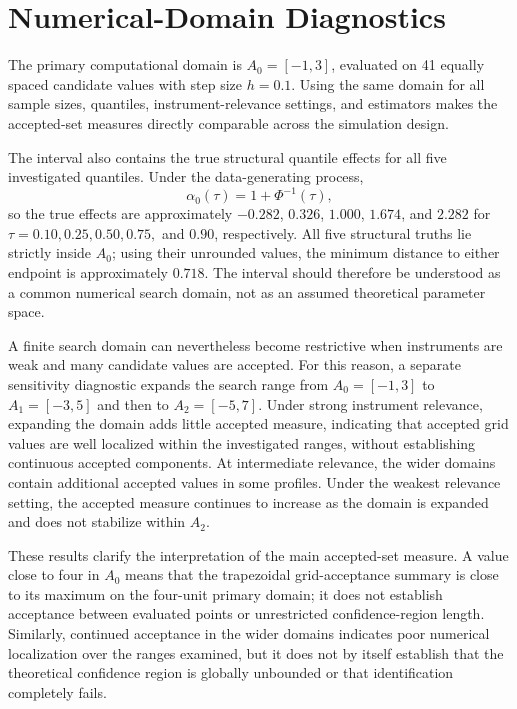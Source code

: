 \section{Numerical-Domain Diagnostics}
\setcounter{equation}{0}\setcounter{table}{0}\setcounter{figure}{0}
\label{app:numerical-domain-diagnostics}

\label{app:domain-choice}

The primary computational domain is \(A_0=[-1,3]\), evaluated on 41 equally spaced candidate values with step size \(h=0.1\). 
Using the same domain for all sample sizes, quantiles, instrument-relevance settings, and estimators makes the accepted-set measures directly comparable across the simulation design.

The interval also contains the true structural quantile effects for all five investigated quantiles. Under the data-generating process,
\[
\alpha_0(\tau)=1+\Phi^{-1}(\tau),
\]
so the true effects are approximately \(-0.282\), \(0.326\), \(1.000\), \(1.674\), and \(2.282\) for \(\tau=0.10,0.25,0.50,0.75,\) and \(0.90\), respectively. All five structural truths lie strictly inside \(A_0\); using their unrounded values, the minimum distance to either endpoint is approximately \(0.718\). The interval should therefore be understood as a common numerical search domain, not as an assumed theoretical parameter space.

A finite search domain can nevertheless become restrictive when instruments are weak and many candidate values are accepted. For this reason, a separate sensitivity diagnostic expands the search range from \(A_0=[-1,3]\) to \(A_1=[-3,5]\) and then to \(A_2=[-5,7]\). Under strong instrument relevance, expanding the domain adds little accepted measure, indicating that accepted grid values are well localized within the investigated ranges, without establishing continuous accepted components. At intermediate relevance, the wider domains contain additional accepted values in some profiles. Under the weakest relevance setting, the accepted measure continues to increase as the domain is expanded and does not stabilize within \(A_2\).

These results clarify the interpretation of the main accepted-set measure. A value close to four in \(A_0\) means that the trapezoidal grid-acceptance summary is close to its maximum on the four-unit primary domain; it does not establish acceptance between evaluated points or unrestricted confidence-region length. Similarly, continued acceptance in the wider domains indicates poor numerical localization over the ranges examined, but it does not by itself establish that the theoretical confidence region is globally unbounded or that identification completely fails.

